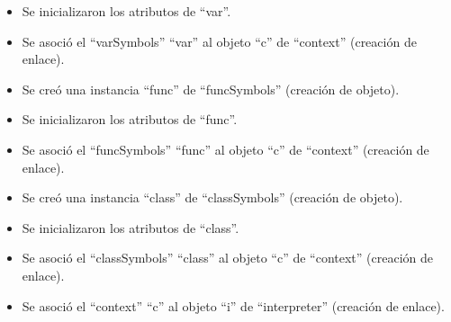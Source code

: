 \begin{framed}
\begin{description}
\begin {itemize}
         \item Se inicializaron los atributos de ``var''.
         \item Se asoció el ``varSymbols'' ``var'' al objeto ``c'' de ``context'' (creación de enlace).
         \item Se creó una instancia ``func'' de ``funcSymbols'' (creación de objeto).
         \item Se inicializaron los atributos de ``func''.
         \item Se asoció el ``funcSymbols'' ``func'' al objeto ``c'' de ``context'' (creación de enlace).
         \item Se creó una instancia ``class'' de ``classSymbols'' (creación de objeto).
         \item Se inicializaron los atributos de ``class''.
         \item Se asoció el ``classSymbols'' ``class'' al objeto ``c'' de ``context'' (creación de enlace).
         \item Se asoció el ``context'' ``c'' al objeto ``i'' de ``interpreter'' (creación de enlace).
      \end{itemize}
	\end{description}
\end{framed}
\FloatBarrier


